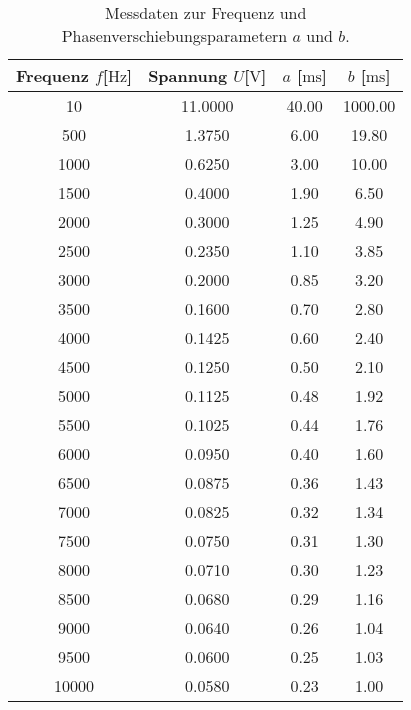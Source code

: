         \begin{table}
            \centering
            \caption{Messdaten zur Frequenz und Phasenverschiebungsparametern $a$ und $b$.}
            \label{tab:freq}
            \begin{tabular}{c c c c}
                \toprule
                Frequenz $f$[$\si{\hertz}$] & Spannung $U$[$\si{\volt}$] & $a$ [$\si{\milli\second}$] & $b$ [$\si{\milli\second}$]\\
                \midrule
                10      &	11.0000       &       40.00  &       1000.00\\        
                500     &	1.3750        &       6.00   &       19.80\\
                1000    &	0.6250        &       3.00   &       10.00\\
                1500    &	0.4000        &       1.90   &       6.50\\
                2000    &	0.3000        &       1.25   &       4.90\\  
                2500    &	0.2350        &       1.10   &     3.85\\   
                3000    &	0.2000        &       0.85   &    3.20\\  
                3500    &	0.1600        &       0.70   &     2.80\\  
                4000    &	0.1425        &       0.60   &     2.40\\   
                4500    &	0.1250        &       0.50   &     2.10\\   
                5000    &	0.1125        &       0.48   &    1.92\\     
                5500    &	0.1025        &       0.44   &    1.76\\     
                6000    &	0.0950        &       0.40   &     1.60\\   
                6500    &	0.0875        &       0.36   &    1.43\\     
                7000    &	0.0825        &       0.32   &    1.34\\     
                7500    &	0.0750        &       0.31   &    1.30\\    
                8000    &	0.0710        &       0.30   &     1.23\\   
                8500    &	0.0680        &       0.29   &    1.16\\    
                9000    &	0.0640        &       0.26   &    1.04\\    
                9500    &	0.0600        &       0.25   &    1.03\\   
                10000   &	0.0580        &       0.23   &    1.00\\    
                \bottomrule
            \end{tabular}
            \end{table}